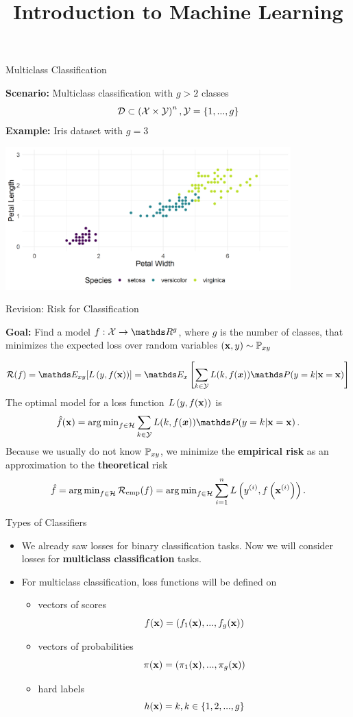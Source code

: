 \documentclass[11pt,compress,t,notes=noshow, xcolor=table]{beamer}
\title{Introduction to Machine Learning}
\date{}
\begin{document}


\sloppy 

\begin{vbframe}{Multiclass Classification}

\textbf{Scenario:} Multiclass classification with $g > 2$ classes
$$\mathcal{D} \subset \left(\mathcal{X} \times \mathcal{Y}\right)^n, \mathcal{Y} = \{1, ..., g\}$$ 
\textbf{Example:} Iris dataset with $g = 3$

\vspace*{0.1cm}
\begin{center}
\includegraphics[width = 11cm ]{figure/iris_scatter.png}
\end{center}

\end{vbframe}

\begin{vbframe}{Revision: Risk for Classification}

\textbf{Goal:} Find a model  $f: \Xspace \to \R^g$, where $g$ is the number of classes, that minimizes the expected loss over random variables $(\mathbf{x}, y) \sim \mathbb{P}_{xy}$ 

$$
 \riskf = \E_{xy}[\Lxy] = \E_{x}\left[\sum_{k \in \Yspace} L(k, f(\bm{x})) \P(y = k| \xv = \xv)\right] 
$$
The optimal model for a loss function $L\left(y, f(\mathbf{x})\right)$ is
$$
  \fxh = \argmin_{f \in \Hspace} \sum_{k \in \Yspace} L(k, f(\bm{x})) \P(y = k| \xv = \xv)\,. $$
Because we usually do not know $\mathbb{P}_{xy}$, we minimize the \textbf{empirical risk} as an approximation to the \textbf{theoretical} risk
$$
\hat{f} = \operatorname{arg\,min}_{f \in \mathcal{H}} \mathcal{R}_{\text{emp}}(f) = \operatorname{arg\,min}_{f \in \mathcal{H}} \sum\limits_{i=1}^n L\left(y^{(i)}, f\left(\mathbf{x}^{(i)}\right)\right).
$$
\end{vbframe}


\begin{vbframe}{Types of Classifiers}
\begin{itemize}
  \item We already saw losses for binary classification tasks. 
  Now we will consider losses for \textbf{multiclass classification} tasks.
  \lz
  \item For multiclass classification, loss functions will be defined on
  \begin{itemize}
    \item vectors of scores $$f(\mathbf{x}) = \left(f_1(\mathbf{x}), ..., f_g(\mathbf{x})\right)$$
    \item vectors of probabilities $$\pi(\mathbf{x}) = \left(\pi_1(\mathbf{x}), ..., \pi_g(\mathbf{x})\right)$$
    \item hard labels $$h(\mathbf{x}) = k, k \in \{1, 2, ..., g\}$$
\end{itemize}
\end{itemize}
\end{vbframe}
\end{document}
